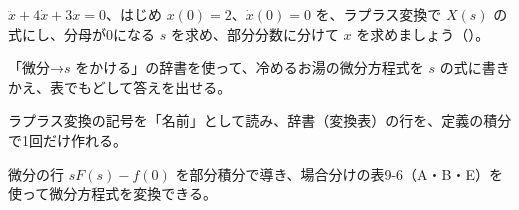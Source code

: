 \bkproblem $\ddot x+4\dot x+3x=0$、はじめ $x(0)=2$、$\dot x(0)=0$ を、ラプラス変換で $X(s)$ の式にし、分母が0になる $s$ を求め、部分分数に分けて $x$ を求めましょう\mbox{（）}。

\begin{furikaeri}
\begin{checklist}
\item 「微分→$s$ をかける」の辞書を使って、冷めるお湯の微分方程式を $s$ の式に書きかえ、表でもどして答えを出せる。
\item ラプラス変換の記号を「名前」として読み、辞書（変換表）の行を、定義の積分で1回だけ作れる。
\item 微分の行 $sF(s)-f(0)$ を部分積分で導き、場合分けの表9-6（A・B・E）を使って微分方程式を変換できる。
\end{checklist}
\end{furikaeri}

